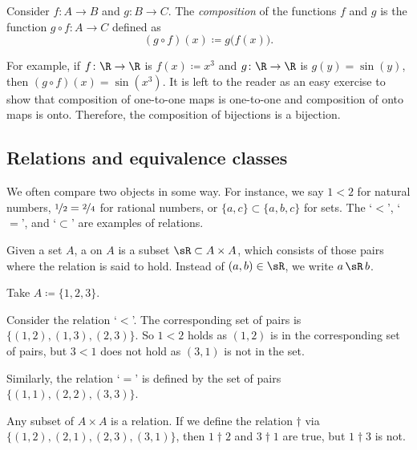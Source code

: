 
\begin{defn}
Consider $f \colon A \to B$ and $g \colon B \to C$.  The
\emph{composition}
of the functions $f$ and $g$ is the function
$g \circ f \colon A \to C$ defined as
\begin{equation*}
(g \circ f)(x) \coloneqq g\bigl(f(x)\bigr) .
\end{equation*}
\end{defn}

For example, if $f \colon \R \to \R$ is $f(x)\coloneqq x^3$ and $g \colon \R \to \R$
is $g(y) = \sin(y)$, then $(g \circ f)(x) = \sin(x^3)$.
It is left to the reader as an easy exercise
to show that composition of one-to-one maps is
one-to-one and composition of onto maps is onto.
Therefore, the composition of bijections is a bijection.

\subsection{Relations and equivalence classes}

We often compare two objects in some way.  For instance, we say $1 < 2$
for natural numbers, $\nicefrac{1}{2} = \nicefrac{2}{4}$ for rational
numbers, or $\{ a,c \} \subset \{ a,b,c \}$ for sets.  The `$<$', `$=$', and
`$\subset$' are examples of
relations.

\begin{defn}
Given a set $A$, a \emph{} on $A$
is a subset $\sR \subset A \times A$,
which consists of those pairs where the relation is said to hold.
Instead of $(a,b) \in \sR$, we write
$a \, \sR \, b$.
\end{defn}

\begin{example}
Take $A \coloneqq \{ 1,2,3 \}$.

Consider the relation `$<$'.  The corresponding set 
of pairs is $\bigl\{ (1,2), (1,3), (2,3) \bigr\}$.  So $1 < 2$ holds as $(1,2)$
is in the corresponding set of pairs, but $3 < 1$ does not hold as $(3,1)$ is
not in the set.

Similarly, the relation `$=$'
is defined by the set of pairs $\bigl\{ (1,1), (2,2), (3,3) \big\}$.

Any subset of $A \times A$ is a relation.  If we define the relation
$\dagger$ via $\bigl\{ (1,2), (2,1), (2,3), (3,1) \bigr\}$, then $1 \dagger 2$ and
$3 \dagger 1$ are
true, but $1 \dagger 3$ is not.
\end{example}

